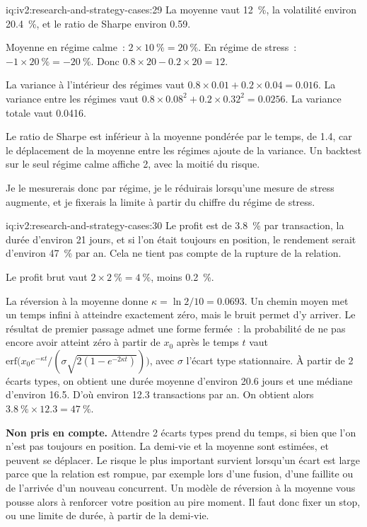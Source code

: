 \begin{solution}{iq:iv2:research-and-strategy-cases:29}
La moyenne vaut 12~\%, la volatilité environ 20.4~\%, et le ratio de Sharpe environ 0.59.

Moyenne en régime calme~: $2 \times 10~\% = 20~\%$. En régime de stress~: $-1 \times 20~\% = -20~\%$. Donc $0.8 \times 20 - 0.2 \times 20 = 12$.

La variance à l'intérieur des régimes vaut $0.8 \times 0.01 + 0.2 \times 0.04 = 0.016$. La variance entre les régimes vaut $0.8 \times 0.08^2 + 0.2 \times 0.32^2 = 0.0256$. La variance totale vaut 0.0416.

Le ratio de Sharpe est inférieur à la moyenne pondérée par le temps, de 1.4, car le déplacement de la moyenne entre les régimes ajoute de la variance. Un backtest sur le seul régime calme affiche 2, avec la moitié du risque.

Je le mesurerais donc par régime, je le réduirais lorsqu'une mesure de stress augmente, et je fixerais la limite à partir du chiffre du régime de stress.

\end{solution}

\begin{solution}{iq:iv2:research-and-strategy-cases:30}
Le profit est de 3.8~\% par transaction, la durée d'environ 21 jours, et si l'on était toujours en position, le rendement serait d'environ 47~\% par an. Cela ne tient pas compte de la rupture de la relation.

Le profit brut vaut $2 \times 2~\% = 4~\%$, moins 0.2~\%.

La réversion à la moyenne donne $\kappa = \ln 2/10 = 0.0693$. Un chemin moyen met un temps infini à atteindre exactement zéro, mais le bruit permet d'y arriver. Le résultat de premier passage admet une forme fermée~: la probabilité de ne pas encore avoir atteint zéro à partir de $x_0$ après le temps $t$ vaut $\mathrm{erf}\bigl(x_0 e^{-\kappa t}/(\sigma\sqrt{2(1 - e^{-2\kappa t})})\bigr)$, avec $\sigma$ l'écart type stationnaire. À partir de 2 écarts types, on obtient une durée moyenne d'environ 20.6 jours et une médiane d'environ 16.5. D'où environ 12.3 transactions par an. On obtient alors $3.8~\% \times 12.3 = 47~\%$.

\textbf{Non pris en compte.} Attendre 2 écarts types prend du temps, si bien que l'on n'est pas toujours en position. La demi-vie et la moyenne sont estimées, et peuvent se déplacer. Le risque le plus important survient lorsqu'un écart est large parce que la relation est rompue, par exemple lors d'une fusion, d'une faillite ou de l'arrivée d'un nouveau concurrent. Un modèle de réversion à la moyenne vous pousse alors à renforcer votre position au pire moment. Il faut donc fixer un stop, ou une limite de durée, à partir de la demi-vie.

\end{solution}

